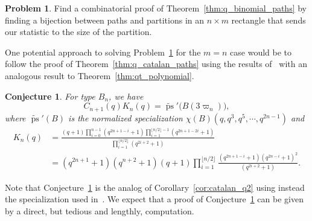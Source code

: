 \documentclass[11pt, leqno]{amsart}
\theoremstyle{plain}
\newtheorem{conjecture}[theorem]{Conjecture}
\theoremstyle{definition}
\newtheorem{problem}[theorem]{Problem}
\numberwithin{equation}{section}
\newcommand{\fw}{\varpi} %
\newcommand{\ps}{\operatorname{ps}} %
\newcommand{\nps}{\widetilde{\ps}} %
\begin{document}
\begin{problem}
\label{prob:combinatorial_q_binom}
Find a combinatorial proof of Theorem~\ref{thm:q_binomial_paths} by finding a bijection between paths and partitions in an $n \times m$ rectangle that sends our statistic to the size of the partition.
\end{problem}

One potential approach to solving Problem~\ref{prob:combinatorial_q_binom} for the $m=n$ case would be to follow the proof of Theorem~\ref{thm:q_catalan_paths} using the results of~\cite[Thm.~1.3]{Stump13} with an analogous result to Theorem~\ref{thm:qt_polynomial}.

\begin{conjecture}
\label{conj:other_specialization}
For type $B_n$, we have
\[
C_{n+1}(q) K_n(q) = \nps'\bigl( B(3\fw_n) \bigr),
\]
where $\nps'(B)$ is the normalized specialization $\chi(B)(q, q^3, q^5, \cdots, q^{2n-1})$ and
\begin{align*}
K_n(q) & = \frac{(q + 1) \prod_{i=0}^{n-1} (q^{2n+1-i} + 1) \prod_{i=1}^{\lfloor n/2 \rfloor - 1} (q^{2n+1-2i} + 1)}{\prod_{i=1}^{\lfloor n/2 \rfloor} (q^{2i+2} + 1)}
\\ & = (q^{2n+1} + 1) (q^{n+2} + 1) (q+1) \prod_{i=1}^{\lfloor n/2 \rfloor} \frac{(q^{2n+1-i} + 1)(q^{2n-i} + 1)^2}{(q^{2i+2} + 1)}.
\end{align*}
\end{conjecture}

Note that Conjecture~\ref{conj:other_specialization} is the analog of Corollary~\ref{cor:catalan_q2} using instead the specialization used in~\cite{BKW16}. 
We expect that a proof of Conjecture~\ref{conj:other_specialization} can be given by a direct, but tedious and lengthly, computation.
\end{document}
